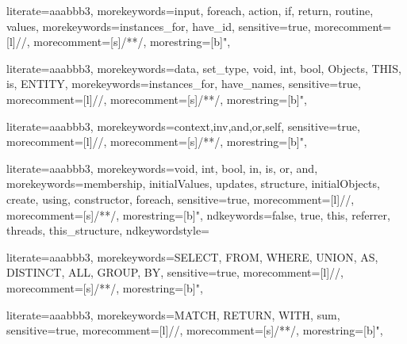 
{
literate={aaa}{bbb}3,
morekeywords={input, foreach, action, if, return, routine, values},
morekeywords={instances_for, have_id},
sensitive=true,
morecomment=[l]{//},
morecomment=[s]{/*}{*/},
morestring=[b]",
}

{
literate={aaa}{bbb}3,
morekeywords={data, set_type, void, int, bool, Objects, THIS, is, ENTITY},
morekeywords={instances_for, have_names},
sensitive=true,
morecomment=[l]{//},
morecomment=[s]{/*}{*/},
morestring=[b]",
}

{
literate={aaa}{bbb}3,
morekeywords={context,inv,and,or,self},
sensitive=true,
morecomment=[l]{//},
morecomment=[s]{/*}{*/},
morestring=[b]",
}

{
literate={aaa}{bbb}3,
morekeywords={void, int, bool, in, is, or, and},
morekeywords={membership, initialValues, updates, structure, initialObjects, create, using, constructor, foreach},
sensitive=true,
morecomment=[l]{//},
morecomment=[s]{/*}{*/},
morestring=[b]",
ndkeywords={false, true, this, referrer, threads, this_structure},
ndkeywordstyle=\color{blue}\bfseries
}

{
literate={aaa}{bbb}3,
morekeywords={SELECT, FROM, WHERE, UNION, AS, DISTINCT, ALL, GROUP, BY},
sensitive=true,
morecomment=[l]{//},
morecomment=[s]{/*}{*/},
morestring=[b]",
}

{
literate={aaa}{bbb}3,
morekeywords={MATCH, RETURN, WITH, sum},
sensitive=true,
morecomment=[l]{//},
morecomment=[s]{/*}{*/},
morestring=[b]",
}

